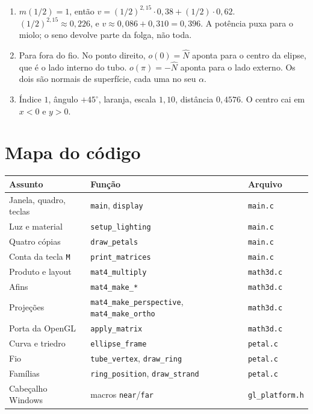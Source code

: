 \documentclass[11pt,a4paper]{article}
\newcommand{\fn}[1]{\texttt{\nobreak\hspace{0pt}#1}}
\begin{document}
\begin{enumerate}
\item \(m(1/2) = 1\), então \(v = (1/2)^{2{,}15}\cdot 0{,}38 + (1/2)\cdot 0{,}62\).
\((1/2)^{2{,}15} \approx 0{,}226\), e \(v \approx 0{,}086 + 0{,}310 = 0{,}396\).
A potência puxa para o miolo; o seno devolve parte da folga, não toda.

\item Para fora do fio. No ponto direito, \(o(0) = \hat N\) aponta para o centro da elipse, que é o lado interno do tubo. \(o(\pi) = -\hat N\) aponta para o lado externo. Os dois são normais de superfície, cada uma no seu \(\alpha\).

\item Índice \(1\), ângulo \(+45^\circ\), laranja, escala \(1{,}10\), distância \(0{,}4576\). O centro cai em \(x < 0\) e \(y > 0\).
\end{enumerate}

\section{Mapa do código}

\begin{center}
\small
\begin{tabularx}{\linewidth}{@{}l l X@{}}
\toprule
Assunto & Função & Arquivo \\
\midrule
Janela, quadro, teclas & \fn{main}, \fn{display} & \fn{main.c} \\
Luz e material & \fn{setup\_lighting} & \fn{main.c} \\
Quatro cópias & \fn{draw\_petals} & \fn{main.c} \\
Conta da tecla \fn{M} & \fn{print\_matrices} & \fn{main.c} \\
Produto e layout & \fn{mat4\_multiply} & \fn{math3d.c} \\
Afins & \fn{mat4\_make\_*} & \fn{math3d.c} \\
Projeções & \fn{mat4\_make\_perspective}, \fn{mat4\_make\_ortho} & \fn{math3d.c} \\
Porta da OpenGL & \fn{apply\_matrix} & \fn{math3d.c} \\
Curva e triedro & \fn{ellipse\_frame} & \fn{petal.c} \\
Fio & \fn{tube\_vertex}, \fn{draw\_ring} & \fn{petal.c} \\
Famílias & \fn{ring\_position}, \fn{draw\_strand} & \fn{petal.c} \\
Cabeçalho Windows & macros \fn{near}/\fn{far} & \fn{gl\_platform.h} \\
\bottomrule
\end{tabularx}
\end{center}
\end{document}
